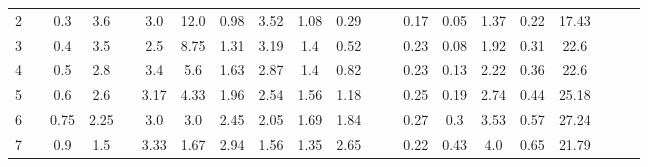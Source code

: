 \documentclass[a4paper,12pt]{article}
\begin{document}
\begin{table}[htp]
\begin{adjustwidth}{-2cm}{}
\begin{tabular}{|c|c|c|c|c|c|c|c|c|c|c|c|c|c|c|c|c|c|c|c|c|}
2     &                      & 0.3  & 3.6  &                       & 3.0  & 12.0 & 0.98 & 3.52 & 1.08 & 0.29 &                       &                      & 0.17      & 0.05      & 1.37 & 0.22   & 17.43      &                       &                        &                      \\ \cline{1-1} \cline{3-4} \cline{6-11} \cline{14-18}
3     &                      & 0.4  & 3.5  &                       & 2.5  & 8.75 & 1.31 & 3.19 & 1.4  & 0.52 &                       &                      & 0.23      & 0.08      & 1.92 & 0.31   & 22.6       &                       &                        &                      \\ \cline{1-1} \cline{3-4} \cline{6-11} \cline{14-18}
4     &                      & 0.5  & 2.8  &                       & 3.4  & 5.6  & 1.63 & 2.87 & 1.4  & 0.82 &                       &                      & 0.23      & 0.13      & 2.22 & 0.36   & 22.6       &                       &                        &                      \\ \cline{1-1} \cline{3-4} \cline{6-11} \cline{14-18}
5     &                      & 0.6  & 2.6  &                       & 3.17 & 4.33 & 1.96 & 2.54 & 1.56 & 1.18 &                       &                      & 0.25      & 0.19      & 2.74 & 0.44   & 25.18      &                       &                        &                      \\ \cline{1-1} \cline{3-4} \cline{6-11} \cline{14-18}
6     &                      & 0.75 & 2.25 &                       & 3.0  & 3.0  & 2.45 & 2.05 & 1.69 & 1.84 &                       &                      & 0.27      & 0.3       & 3.53 & 0.57   & 27.24      &                       &                        &                      \\ \cline{1-1} \cline{3-4} \cline{6-11} \cline{14-18}
7     &                      & 0.9  & 1.5  &                       & 3.33 & 1.67 & 2.94 & 1.56 & 1.35 & 2.65 &                       &                      & 0.22      & 0.43      & 4.0  & 0.65   & 21.79      &                       &                        &                      \\ \hline\end{tabular}
	\end{adjustwidth}

\end{table}	
\end{document}

